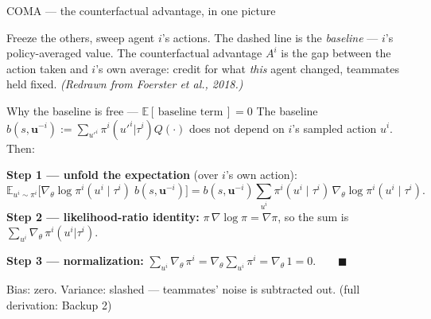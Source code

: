 \documentclass[10pt, aspectratio=169]{beamer}
\begin{document}
\begin{frame}{COMA --- the counterfactual advantage, in one picture}
\centering
{}

\smallskip
{\footnotesize\textcolor{mLightBrown}{Freeze the others, sweep agent $i$'s actions. The dashed line is the \emph{baseline} --- $i$'s policy-averaged value. The counterfactual advantage $A^i$ is the \alert{gap between the action taken and $i$'s own average}: credit for what \emph{this} agent changed, teammates held fixed. \emph{(Redrawn from Foerster et al., 2018.)}}}
\end{frame}

\begin{frame}{Why the baseline is free --- $\mathbb{E}[\,\text{baseline term}\,]=0$}
The baseline $b(s,\mathbf{u}^{-i}) := \sum_{u'^i}\pi^i(u'^i|\tau^i)Q(\cdot)$ does \alert{not depend on $i$'s sampled action $u^i$}. Then:
\medskip

\textbf{Step 1 --- unfold the expectation} (over $i$'s own action):
\[
\mathbb{E}_{u^i\sim\pi^i}\Big[ \nabla_\theta \log\pi^i(u^i\mid\tau^i)\; b(s,\mathbf{u}^{-i}) \Big] = b(s,\mathbf{u}^{-i}) \sum_{u^i} \pi^i(u^i\mid\tau^i)\, \nabla_\theta\log\pi^i(u^i\mid\tau^i).
\]
\pause
\textbf{Step 2 --- likelihood-ratio identity:} $\pi\,\nabla\log\pi = \nabla\pi$, so the sum is $\sum_{u^i}\nabla_\theta\,\pi^i(u^i|\tau^i)$.
\medskip

\pause
\textbf{Step 3 --- normalization:} $\displaystyle \sum_{u^i}\nabla_\theta\,\pi^i = \nabla_\theta \sum_{u^i}\pi^i = \nabla_\theta\, 1 = 0. \qquad\blacksquare$
\medskip

\pause
Bias: zero. Variance: slashed --- teammates' noise is subtracted out. \hfill {\footnotesize\textcolor{mLightBrown}{(full derivation: Backup 2)}}
\end{frame}
\end{document}
